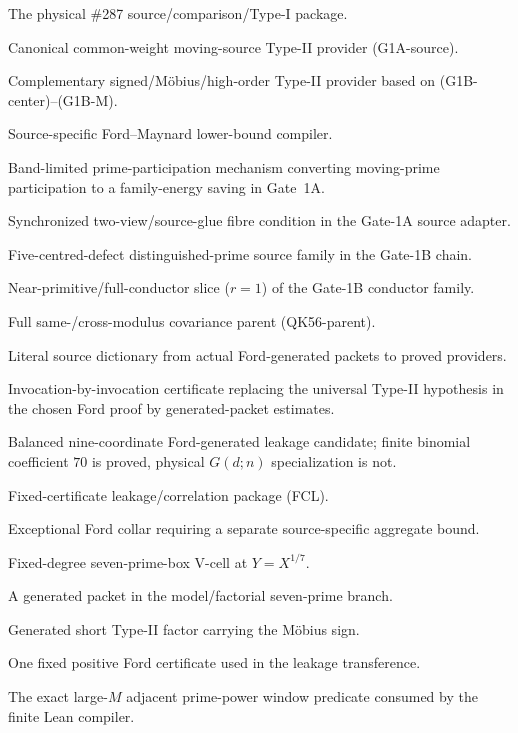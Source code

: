 \documentclass[11pt]{article}
\theoremstyle{definition}
\newcommand{\1}{\mathbf 1}
\begin{document}
{{{\begin{description}[leftmargin=3.4cm,style=nextline]
\item[Gate 0] The physical \#287 source/comparison/Type-I package.
\item[Gate 1A] Canonical common-weight moving-source Type-II provider (G1A-source).
\item[Gate 1B] Complementary signed/M\"obius/high-order Type-II provider based on
(G1B-center)--(G1B-M).
\item[Gate 2] Source-specific Ford--Maynard lower-bound compiler.
\item[BPP] Band-limited prime-participation mechanism converting moving-prime participation
to a family-energy saving in Gate~1A.
\item[SB-$\nu$] Synchronized two-view/source-glue fibre condition in the Gate-1A source
adapter.
\item[Pure5] Five-centred-defect distinguished-prime source family in the Gate-1B chain.
\item[NearPrim] Near-primitive/full-conductor slice ($r=1$) of the Gate-1B conductor family.
\item[QK56] Full same-/cross-modulus covariance parent (QK56-parent).
\item[SOURCE-ADAPTER45] Literal source dictionary from actual Ford-generated packets to
proved providers.
\item[$C_{\rm FM}$] Invocation-by-invocation certificate replacing the universal Type-II
hypothesis in the chosen Ford proof by generated-packet estimates.
\item[$R_9$] Balanced nine-coordinate Ford-generated leakage candidate; finite binomial
coefficient $70$ is proved, physical $G(d;n)$ specialization is not.
\item[FCL] Fixed-certificate leakage/correlation package (FCL).
\item[$N_2$] Exceptional Ford collar requiring a separate source-specific aggregate bound.
\item[Balanced7] Fixed-degree seven-prime-box V-cell at $Y=X^{1/7}$.
\item[V-cell] A generated packet in the model/factorial seven-prime branch.
\item[M\"obius singleton] Generated short Type-II factor carrying the M\"obius sign.
\item[fixed-$g_\ast$] One fixed positive Ford certificate used in the leakage transference.
\item[\texttt{WindowPairSupply}] The exact large-$M$ adjacent prime-power window predicate consumed by the finite
Lean compiler.
\end{description}


}}}
\end{document}
